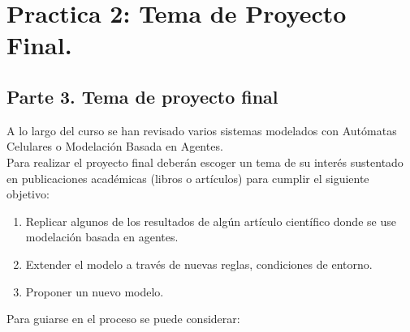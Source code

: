 \documentclass[12pt]{article}
\begin{document}

{\color{red} \section*{Practica 2: Tema de Proyecto Final.}}


{\color{blue} \subsection*{Parte 3. Tema de proyecto final }}
\vspace{1em}

A lo largo del curso se han revisado varios sistemas modelados con Autómatas Celulares o Modelación Basada en Agentes.\\

Para realizar el proyecto final deberán escoger un tema de su interés sustentado en publicaciones académicas (libros o artículos) para
cumplir el siguiente objetivo:\\

\begin{enumerate}
    \item Replicar algunos de los resultados de algún artículo científico donde se use modelación basada en agentes.\\
    \item Extender el modelo a través de nuevas reglas, condiciones de entorno.\\
    \item Proponer un nuevo modelo.\\
\end{enumerate}

Para guiarse en el proceso se puede considerar:\\
\end{document}
